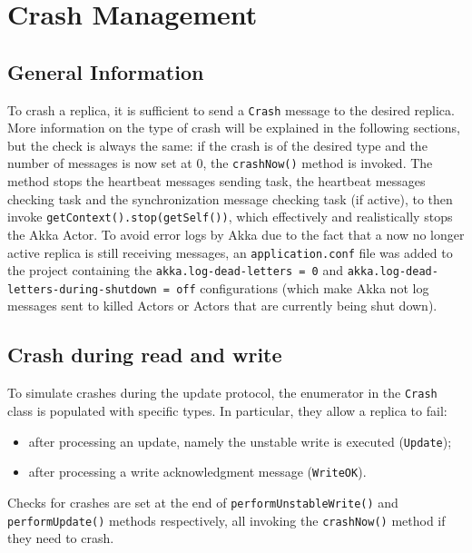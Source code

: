 \section{Crash Management}

\subsection{General Information}

To crash a replica, it is sufficient to send a \texttt{Crash} message to the desired replica. More information on the type of crash will be explained in the following sections, but the check is always the same: if the crash is of the desired type and the number of messages is now set at 0, the \texttt{crashNow()} method is invoked. The method stops the heartbeat messages sending task, the heartbeat messages checking task and the synchronization message checking task (if active), to then invoke \texttt{getContext().stop(getSelf())}, which effectively and realistically stops the Akka Actor. To avoid error logs by Akka due to the fact that a now no longer active replica is still receiving messages, an \texttt{application.conf} file was added to the project containing the \texttt{akka.log-dead-letters = 0} and \texttt{akka.log-dead-letters-during-shutdown = off} configurations (which make Akka not log messages sent to killed Actors or Actors that are currently being shut down).

\subsection{Crash during read and write}

To simulate crashes during the update protocol, the enumerator in the \texttt{Crash} class is populated with specific types. In particular, they allow a replica to fail:

\begin{itemize}
\item after processing an update, namely the unstable write is executed (\texttt{Update});

\item after processing a write acknowledgment message (\texttt{WriteOK}).
\end{itemize}

Checks for crashes are set at the end of \texttt{performUnstableWrite()} and \texttt{performUpdate()} methods respectively, all invoking the \texttt{crashNow()} method if they need to crash.

